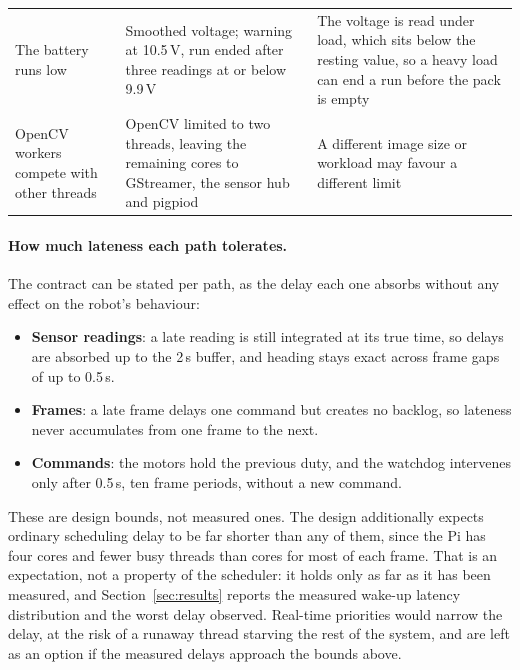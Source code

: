 \begin{table}[H]
\begin{tabularx}{\textwidth}{@{}XXX@{}}
            The battery runs low
                                  & Smoothed voltage; warning at 10.5\,V, run ended after three readings at or below 9.9\,V
                                  & The voltage is read under load, which sits below the resting value, so a heavy load can end a run before the pack is empty                                                            \\
            OpenCV workers compete with other threads
                                  & OpenCV limited to two threads, leaving the remaining cores to GStreamer, the sensor hub and pigpiod
                                  & A different image size or workload may favour a different limit                                                                                                                       \\
            \bottomrule
      \end{tabularx}
\end{table}

\paragraph{How much lateness each path tolerates.}
The contract can be stated per path, as the delay each one absorbs without any
effect on the robot's behaviour:

\begin{itemize}
      \item \textbf{Sensor readings}: a late reading is still integrated at its
            true time, so delays are absorbed up to the 2\,s buffer, and heading
            stays exact across frame gaps of up to 0.5\,s.
      \item \textbf{Frames}: a late frame delays one command but creates no
            backlog, so lateness never accumulates from one frame to the next.
      \item \textbf{Commands}: the motors hold the previous duty, and the
            watchdog intervenes only after 0.5\,s, ten frame periods, without a
            new command.
\end{itemize}

These are design bounds, not measured ones. The design additionally expects
ordinary scheduling delay to be far shorter than any of them, since the Pi has
four cores and fewer busy threads than cores for most of each frame. That is an
expectation, not a property of the scheduler: it holds only as far as it has
been measured, and Section~\ref{sec:results} reports the measured wake-up
latency distribution and the worst delay observed. Real-time priorities would
narrow the delay, at the risk of a runaway thread starving the rest of the
system, and are left as an option if the measured delays approach the bounds
above.


